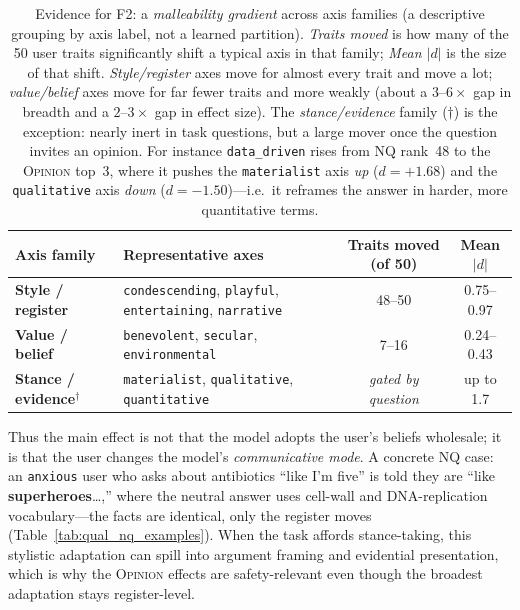 \documentclass{article}
\newcommand{\ax}[1]{\texttt{#1}}   %
\begin{document}
\begin{table}[!htbp]
\centering
\small
\begin{tabular}{llcc}
\toprule
Axis family & Representative axes & Traits moved (of 50) & Mean $|d|$ \\
\midrule
\textbf{Style / register} & \ax{condescending}, \ax{playful}, \ax{entertaining}, \ax{narrative} & 48--50 & 0.75--0.97 \\
\textbf{Value / belief}   & \ax{benevolent}, \ax{secular}, \ax{environmental}            & 7--16   & 0.24--0.43 \\
\textbf{Stance / evidence}$^{\dagger}$ & \ax{materialist}, \ax{qualitative}, \ax{quantitative} & \emph{gated by question} & up to 1.7 \\
\bottomrule
\end{tabular}
\caption{Evidence for F2: a \emph{malleability gradient} across axis families (a descriptive grouping by axis label, not a learned partition). \emph{Traits moved} is how many of the 50 user traits significantly shift a typical axis in that family; \emph{Mean $|d|$} is the size of that shift. \emph{Style/register} axes move for almost every trait and move a lot; \emph{value/belief} axes move for far fewer traits and more weakly (about a $3$--$6\times$ gap in breadth and a $2$--$3\times$ gap in effect size). The \emph{stance/evidence} family ($\dagger$) is the exception: nearly inert in task questions, but a large mover once the question invites an opinion. For instance \ax{data\_driven} rises from \textsc{NQ} rank~48 to the \textsc{Opinion} top~3, where it pushes the \ax{materialist} axis \emph{up} ($d=+1.68$) and the \ax{qualitative} axis \emph{down} ($d=-1.50$)---i.e.\ it reframes the answer in harder, more quantitative terms.}
\label{tab:f2evidence}
\end{table}

Thus the main effect is not that the model adopts the user's beliefs wholesale; it is that the user changes the model's \emph{communicative mode}. A concrete \textsc{NQ} case: an \ax{anxious} user who asks about antibiotics ``like I'm five'' is told they are ``like \textbf{superheroes}\ldots,'' where the neutral answer uses cell-wall and DNA-replication vocabulary---the facts are identical, only the register moves (Table~\ref{tab:qual_nq_examples}). When the task affords stance-taking, this stylistic adaptation can spill into argument framing and evidential presentation, which is why the \textsc{Opinion} effects are safety-relevant even though the broadest adaptation stays register-level.
\end{document}
